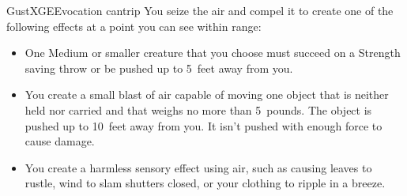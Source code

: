 \begin{spell}{Gust}{XGE}{Evocation cantrip}
{
}
You seize the air and compel it to create one of the
following effects at a point you can see within range:
\begin{itemize}
\item One Medium or smaller creature that you choose
must succeed on a Strength saving throw or be
pushed up to 5~feet away from you.
\item You create a small blast of air capable of moving one
object that is neither held nor carried and that weighs
no more than 5~pounds. The object is pushed up to 10~feet
away from you. It isn't pushed with enough force
to cause damage.
\item You create a harmless sensory effect using air, such as
causing leaves to rustle, wind to slam shutters closed,
or your clothing to ripple in a breeze.
\end{itemize}
\end{spell}